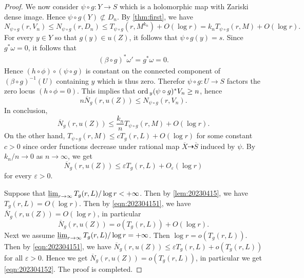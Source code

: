 \documentclass[11pt,english]{smfart}
\theoremstyle{plain}
\theoremstyle{definition}
\theoremstyle{remark}
\numberwithin{equation}{section}
\theoremstyle{plain}
\def\ep{\varepsilon}
\newcommand{\ord}{{\rm ord}\,}
\begin{document}
\begin{proof}
We now consider $\psi\circ g:Y\to S$ which is a holomorphic map with Zariski dense image.
Hence $\psi\circ g(Y)\not\subset D_n$.
By \cref{thm:first}, we have
	$$
	N_{\psi\circ g}(r, V_n)\leq N_{\psi\circ g}(r, D_n)\leq T_{\psi\circ g}(r, M^{k_n})+O(\log r)=k_n T_{\psi\circ g}(r, M)+O(\log r).
	$$
	For every $y\in Y$ so that $g(y)\in u(Z)$, it follows that $\psi\circ g(y)=s$. 
	Since $g^*\omega=0$, it follows that
	\begin{align}\label{eq:nontrivial}
		(\beta\circ g)^*\omega'=g^*\omega=0.
	\end{align}
	Hence $(h\circ\phi)\circ (\psi \circ g)$ is constant on the connected component of $(\beta\circ g)^{-1}(U)$ containing $y$ which is thus zero.
	Therefor $\psi\circ g:U\to S$ factors the zero locus $(h\circ \phi=0)$.
	This implies that  $\ord_y(\psi \circ g)^*V_n\geq n$, hence
	$$
	n\overline{N}_{g}(r, u(Z))\leq N_{\psi\circ g}(r, V_n).
	$$
	In conclusion,
	$$
	\overline{N}_{g}(r, u(Z))\leq \frac{k_n}{n} T_{\psi\circ g}(r, M)+O(\log r).
	$$
On the other hand, $T_{\psi\circ g}(r, M)\leq cT_{g}(r, L)+O(\log r)$ for some constant $c>0$ since order functions decrease under rational map $\overline{X}\dashrightarrow \overline{S}$ induced by $\psi$.  
By $k_n/n\to 0$ as $n\to \infty$, we get 
\begin{equation}\label{eqn:202304151}
	\overline{N}_{g}(r, u(Z))\leq \ep T_{g}(r, L)+O_{\varepsilon}(\log r) 
	\end{equation}
	for every $\ep>0$.  
	
	
	Suppose that $\varliminf_{r\to\infty}T_g(r,L)/\log r<+\infty$.
	Then by \cref{lem:20230415}, we have $T_g(r,L)=O(\log r)$.
			Then by \eqref{eqn:202304151}, we have $\overline{N}_{g}(r, u(Z))=O(\log r)$, in particular 
	\begin{equation}\label{eqn:202304152}
	\overline{N}_{g}(r, u(Z))=o(T_{g}(r,L))+O(\log r).
	\end{equation}	
		Next we assume $\varliminf_{r\to\infty}T_g(r,L)/\log r=+\infty$.
		Then $\log r=o(T_g(r,L))$.		
		Then by \eqref{eqn:202304151}, we have $\overline{N}_{g}(r, u(Z))\leq \ep T_{g}(r, L)+o(T_g(r,L))$ for all $\varepsilon>0$.	
		Hence we get $\overline{N}_{g}(r, u(Z))=o(T_g(r,L))$, in particular we get \eqref{eqn:202304152}.	
		The proof is completed.	
\end{proof}
\end{document}
